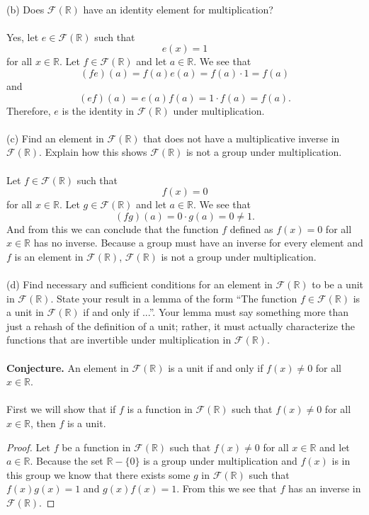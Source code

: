 \documentclass[11pt,a4paper]{article}
\begin{document}
~\\
(b) Does $\mathcal{F}(\mathbb{R})$ have an identity element for multiplication?\\
~\\
Yes, let $e\in\mathcal{F}(\mathbb{R})$ such that
\[e(x)=1\]
for all $x\in\mathbb{R}$. Let $f\in\mathcal{F}(\mathbb{R})$ and let $a\in\mathbb{R}$. We see that
\[(fe)(a)=f(a)e(a)=f(a)\cdot 1=f(a)\]
and
\[(ef)(a)=e(a)f(a)=1\cdot f(a)=f(a).\]
Therefore, $e$ is the identity in $\mathcal{F}(\mathbb{R})$ under multiplication.\\
~\\
(c) Find an element in $\mathcal{F}(\mathbb{R})$ that does not have a multiplicative inverse in $\mathcal{F}(\mathbb{R})$. Explain how this shows $\mathcal{F}(\mathbb{R})$ is not a group under multiplication.\\
~\\
Let $f\in\mathcal{F}(\mathbb{R})$ such that
\[f(x)=0\]
for all $x\in\mathbb{R}$. Let $g\in\mathcal{F}(\mathbb{R})$ and let $a\in\mathbb{R}$. We see that
\[(fg)(a)=0\cdot g(a)=0\neq 1.\]
And from this we can conclude that the function $f$ defined as $f(x)=0$ for all $x\in\mathbb{R}$ has no inverse. Because a group must have an inverse for every element and $f$ is an element in $\mathcal{F}(\mathbb{R})$, $\mathcal{F}(\mathbb{R})$ is not a group under multiplication.\\
~\\
(d) Find necessary and sufficient conditions for an element in $\mathcal{F}(\mathbb{R})$ to be a unit in $\mathcal{F}(\mathbb{R})$. State your result in a lemma of the form ``The function $f\in\mathcal{F}(\mathbb{R})$ is a unit in $\mathcal{F}(\mathbb{R})$ if and only if ...''. Your lemma must say something more than just a rehash of the definition of a unit; rather, it must actually characterize the functions that are invertible under multiplication in $\mathcal{F}(\mathbb{R})$.\\
~\\
{\bf Conjecture.} An element in $\mathcal{F}(\mathbb{R})$ is a unit if and only if $f(x)\neq 0$ for all $x\in\mathbb{R}$.\\
~\\
First we will show that if $f$ is a function in $\mathcal{F}(\mathbb{R})$ such that $f(x)\neq 0$ for all $x\in\mathbb{R}$, then $f$ is a unit.
\begin{proof}
Let $f$ be a function in $\mathcal{F}(\mathbb{R})$ such that $f(x)\neq 0$ for all $x\in\mathbb{R}$ and let $a\in\mathbb{R}$. Because the set $\mathbb{R}-\{0\}$ is a group under multiplication and $f(x)$ is in this group we know that there exists some $g$ in $\mathcal{F}(\mathbb{R})$ such that $f(x)g(x)=1$ and $g(x)f(x)=1$. From this we see that $f$ has an inverse in $\mathcal{F}(\mathbb{R})$.
\end{proof}
\end{document}
